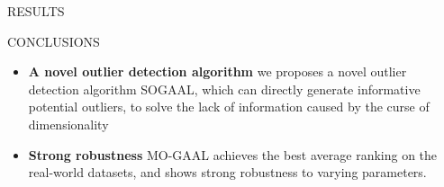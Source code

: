 \documentclass[final]{beamer}
\newlength{\sepwidth}
\newlength{\colwidth}
\newcommand{\separatorcolumn}{\begin{column}{\sepwidth}\end{column}}
\begin{document}
\begin{frame}[t]
\begin{columns}[t]
\begin{column}{\colwidth}
\begin{block}{RESULTS}
  \end{block}

  \begin{block}{CONCLUSIONS}
  	
  	\begin{itemize}
  	\item \textbf{A novel outlier detection algorithm} we proposes a novel outlier detection algorithm SOGAAL, which can directly generate informative potential outliers, to solve the lack of information caused by the curse of dimensionality \\
  	\item \textbf{Strong robustness} MO-GAAL achieves the best average ranking on the real-world datasets, and shows strong robustness to varying parameters.
  	\end{itemize}
  
  \end{block}

\end{column}

\separatorcolumn
\end{columns}
\end{frame}
\end{document}
